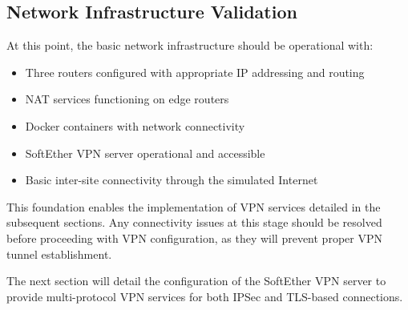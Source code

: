 \subsection{Network Infrastructure Validation}

At this point, the basic network infrastructure should be operational with:

\begin{itemize}
    \item Three routers configured with appropriate IP addressing and routing
    \item NAT services functioning on edge routers
    \item Docker containers with network connectivity
    \item SoftEther VPN server operational and accessible
    \item Basic inter-site connectivity through the simulated Internet
\end{itemize}

This foundation enables the implementation of VPN services detailed in the subsequent sections. Any connectivity issues at this stage should be resolved before proceeding with VPN configuration, as they will prevent proper VPN tunnel establishment.

The next section will detail the configuration of the SoftEther VPN server to provide multi-protocol VPN services for both IPSec and TLS-based connections.
